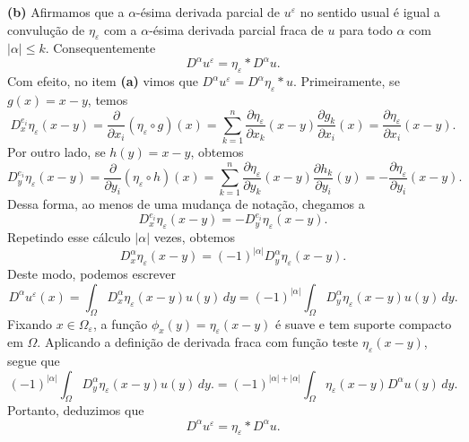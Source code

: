\documentclass[a4paper, 11pt]{book}
\theoremstyle{definition}
\begin{document}
\begin{prf}
    \textbf{(b)} Afirmamos que a $\alpha$-ésima derivada parcial de $u^\varepsilon$ no sentido usual é igual a convulução de $\eta_\varepsilon$ com a $\alpha$-ésima derivada parcial fraca de $u$ para todo $\alpha$ com $|\alpha| \leqslant k$. 
    Consequentemente
    \[
        D^\alpha u^\varepsilon = \eta_\varepsilon * D^\alpha u.
    \]
    Com efeito, no item \textbf{(a)} vimos que $D^\alpha u^\varepsilon = D^\alpha \eta_\varepsilon * u$. Primeiramente, se $g(x) = x - y$, temos
    \[
        D^{e_i}_x \eta_\varepsilon (x -y) = \dfrac{\partial}{\partial x_i} (\eta_\varepsilon \circ g)(x) = \sum_{k=1}^n \dfrac{\partial \eta_\varepsilon}{\partial x_k} (x - y) \dfrac{\partial g_k}{\partial x_i}(x) = \dfrac{\partial \eta_\varepsilon}{\partial x_i}(x-y).
    \]
    Por outro lado, se $h(y) = x - y$, obtemos
    \[
        D^{e_i}_y \eta_\varepsilon (x-y) = \dfrac{\partial}{\partial y_i} (\eta_\varepsilon \circ h)(x) = \sum_{k=1}^n \dfrac{\partial \eta_\varepsilon}{\partial y_k} (x - y) \dfrac{\partial h_k}{\partial y_i}(y) = -\dfrac{\partial \eta_\varepsilon}{\partial y_i}(x-y).
    \]
    Dessa forma, ao menos de uma mudança de notação, chegamos a
    \[
        D^{e_i}_x \eta_\varepsilon (x-y) = -D^{e_i}_y \eta_\varepsilon (x-y).
    \]
    Repetindo esse cálculo $|\alpha|$ vezes, obtemos
    \[
        D^\alpha_x \eta_\varepsilon (x-y) = (-1)^{|\alpha|} D^\alpha_y \eta_\varepsilon (x-y).
    \]
    Deste modo, podemos escrever
    \[
        D^{\alpha} u^\varepsilon (x) = \int_\Omega D^\alpha_x \eta_\varepsilon (x-y) u(y) \,dy = (-1)^{|\alpha|} \int_\Omega D^{\alpha}_y \eta_\varepsilon (x-y) u(y) \,dy.
    \]
    Fixando $x \in \Omega_\varepsilon$, a função $\phi_x(y) =\eta_\varepsilon(x-y)$ é suave e tem suporte compacto em $\Omega$.
    Aplicando a definição de derivada fraca com função teste $\eta_\varepsilon(x-y)$, segue que
    \[
        (-1)^{|\alpha|} \int_\Omega D^{\alpha}_y \eta_\varepsilon (x-y) u(y) \,dy. = (-1)^{|\alpha| + |\alpha|}  \int_\Omega \eta_\varepsilon(x-y) D^{\alpha} u(y) \,dy.
    \]
    Portanto, deduzimos que
    \begin{equation}
        D^\alpha u^\varepsilon = \eta_\varepsilon * D^\alpha u.
    \end{equation}


\end{prf}
\end{document}
